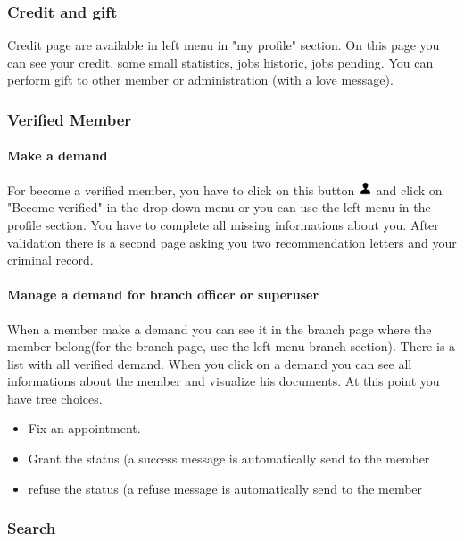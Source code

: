 \documentclass[11pt, a4paper]{article}      %
\begin{document}
\subsubsection{Credit and gift}

Credit page are available in left menu in "my profile" section. On this page you can see your credit, some small statistics, jobs historic, jobs pending. You can perform gift to other member or administration (with a love message).

\subsubsection{Verified Member}

\paragraph{Make a demand}
For become a verified member, you have to click on this button \includegraphics[width=0.4cm]{user_icon.png} and click on "Become verified" in the drop down menu or you can use the left menu in the profile section.
You have to complete all missing informations about you. After validation there is a second page asking you two recommendation letters and your criminal record.

\paragraph{Manage a demand for branch officer or superuser}
When a member make a demand you can see it in the branch page where the member belong(for the branch page, use the left menu branch section). There is a list with all verified demand. When you click on a demand you can see all informations about the member and visualize his documents. At this point you have tree choices. 
\begin{itemize}
    \item Fix an appointment.
    \item Grant the status (a success message is automatically send to the member
    \item refuse the status (a refuse message is automatically send to the member
\end{itemize}

\subsubsection{Search}
\end{document}
